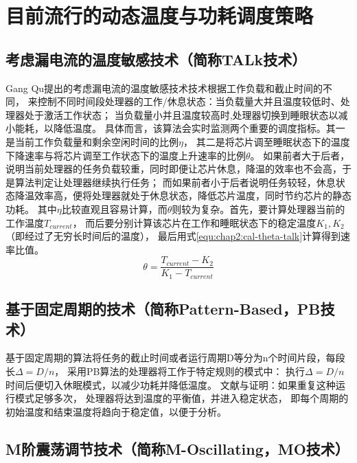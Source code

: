 \section{目前流行的动态温度与功耗调度策略}
\label{sec:algorithms}
\subsection{考虑漏电流的温度敏感技术（简称TALk技术）}
Gang Qu提出的考虑漏电流的温度敏感技术技术根据工作负载和截止时间的不同， 来控制不同时间段处理器的工作/休息状态：当负载量大并且温度较低时、处理器处于激活工作状态； 当负载量小并且温度较高时,处理器切换到睡眼状态以减小能耗，以降低温度。
具体而言，该算法会实时监测两个重要的调度指标。其一是当前工作负载量和剩余空闲时间的比例$\eta$， 其二是将芯片调至睡眠状态下的温度下降速率与将芯片调至工作状态下的温度上升速率的比例$\theta$。 如果前者大于后者，说明当前处理器的任务负载较重，同时即便让芯片休息，降温的效率也不会高，于是算法判定让处理器继续执行任务； 而如果前者小于后者说明任务较轻，休息状态降温效率高，便将处理器就处于休息状态，降低芯片温度，同时节约芯片的静态功耗。 其中$\eta$比较直观且容易计算，而$\theta$则较为复杂。首先，要计算处理器当前的工作温度$T_{current}$， 而后要分别计算该芯片在工作和睡眠状态下的稳定温度$K_1,K_2$（即经过了无穷长时间后的温度）， 最后用式\ref{equ:chap2:cal-theta-talk}计算得到速率比值。
\begin{equation}
\label{equ:chap2:cal-theta-talk}
\theta=\frac{T_{current}-K_2}{K_1-T_{current}}
\end{equation}



\subsection{基于固定周期的技术（简称Pattern-Based，PB技术）}

基于固定周期的算法将任务的截止时间或者运行周期D等分为n个时间片段，每段长$\Delta=D/n$， 采用PB算法的处理器将工作于特定规则的模式中： 执行$\Delta=D/n$时间后便切入休眠模式，以减少功耗并降低温度。 文献与证明：如果重复这种运行模式足够多次， 处理器将达到温度的平衡值，并进入稳定状态， 即每个周期的初始温度和结束温度将趋向于稳定值，以便于分析。

\subsection{M阶震荡调节技术（简称M-Oscillating，MO技术）}

